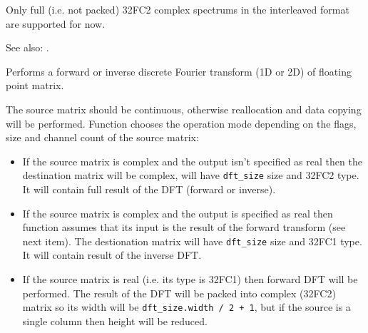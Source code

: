 \begin{description}
\end{description}

Only full (i.e. not packed) 32FC2 complex spectrums in the interleaved format are supported for now.

See also: .


Performs a forward or inverse discrete Fourier transform (1D or 2D) of floating point matrix.


\begin{description}
\end{description}

The source matrix should be continuous, otherwise reallocation and data copying will be performed. Function chooses the operation mode depending on the flags, size and channel count of the source matrix:
\begin{itemize}
  \item If the source matrix is complex and the output isn't specified as real then the destination matrix will be complex, will have \texttt{dft\_size} size and 32FC2 type. It will contain full result of the DFT (forward or inverse).
  \item If the source matrix is complex and the output is specified as real then function assumes that its input is the result of the forward transform (see next item). The destionation matrix will have \texttt{dft\_size} size and 32FC1 type. It will contain result of the inverse DFT.
  \item If the source matrix is real (i.e. its type is 32FC1) then forward DFT will be performed. The result of the DFT will be packed into complex (32FC2) matrix so its width will be \texttt{dft\_size.width / 2 + 1}, but if the source is a single column then height will be reduced.
\end{itemize}

